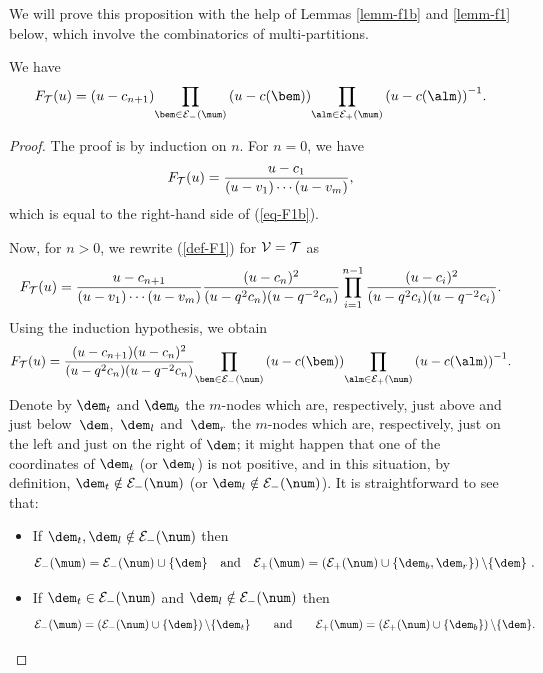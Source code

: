 We will prove this proposition with the help of Lemmas \ref{lemm-f1b} and \ref{lemm-f1} below, which involve the combinatorics of multi-partitions.

\begin{Lemma}\label{lemm-f1b} We have
\begin{gather}\label{eq-F1b}
F_{{\cal{T}}}(u)=(u-c_{n+1}) {\prod_{\bem\in {\cal{E}}_-(\mum)}\left(u-c(\bem)\right)} {\prod_{\alm\in {\cal{E}}_+(\mum)}\left(u-c(\alm)\right)^{-1}}  .
\end{gather}
\end{Lemma}

\begin{proof}
 The proof  is by induction on $n$. For $n=0$, we have
\[
F_{{\cal{T}}}(u)=\frac{u-c_1}{(u-v_1)\cdots(u-v_m)},
\]
which is equal to the right-hand side of (\ref{eq-F1b}).


Now, for $n>0$, we rewrite (\ref{def-F1}) for ${\cal{V}}={\cal{T}}$ as
\[
F_{{\cal{T}}}(u)=\frac{u-c_{n+1}}{(u-v_1)\cdots(u-v_m)}\frac{(u-c_n)^2}{(u-q^2c_n)(u-q^{-2}c_n)}\prod_{i=1}^{n-1}\frac{(u-c_i)^2}{(u-q^2c_i)(u-q^{-2}c_i)}  .
\]
Using the induction hypothesis, we obtain
\begin{gather}\label{eq-F1c}
F_{{\cal{T}}}(u)=\frac{(u-c_{n+1})(u-c_n)^2}{(u-q^2c_n)(u-q^{-2}c_n)}
{\prod_{\bem\in {\cal{E}}_-(\num)}\left(u-c(\bem)\right)} {\prod_{\alm\in {\cal{E}}_+(\num)}\left(u-c(\alm)\right)^{-1}}  .
\end{gather}
Denote by $\dem_t$ and $\dem_b$ the $m$-nodes which are, respectively, just above and just below~$\dem$,~$\dem_l$ and~$\dem_r$ the $m$-nodes which are, respectively, just on the left and just on the right of $\dem$; it might happen that one of the coordinates of $\dem_t$ (or $\dem_l$) is not positive, and in this situation, by def\/inition, $\dem_t\notin {\cal{E}}_-(\num)$ (or $\dem_l\notin {\cal{E}}_-(\num)$).
It is straightforward to see that:
\begin{itemize}\itemsep=0pt
\item If $\dem_t,\dem_l\notin {\cal{E}}_-(\num)$ then \[{\cal{E}}_-(\mum)={\cal{E}}_-(\num)\cup\{\dem\}\quad\textrm{and}\quad {\cal{E}}_+(\mum)=\left({\cal{E}}_+(\num)\cup\{\dem_b,\dem_r\}\right)\backslash\{\dem\}\ .\]

\item If $\dem_t\in {\cal{E}}_-(\num)$ and $\dem_l\notin {\cal{E}}_-(\num)$ then \[{\cal{E}}_-(\mum)=\left({\cal{E}}_-(\num)\cup\{\dem\}\right)\backslash\{\dem_t\}\qquad\textrm{and}\qquad {\cal{E}}_+(\mum)=\left({\cal{E}}_+(\num)\cup\{\dem_b\}\right)\backslash\{\dem\}  .\]


\end{itemize}
\end{proof}
